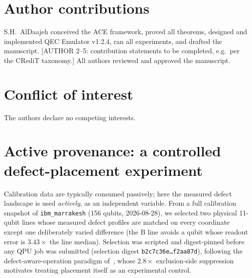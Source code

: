 \documentclass[11pt,a4paper]{article}
\begin{document}
\section*{Author contributions}
S.H.\ AlDaajeh conceived the ACE framework, proved all theorems, designed
and implemented QEC Emulator v1.2.4, ran all experiments, and drafted the
manuscript. [AUTHOR 2--5: contribution statements to be completed, e.g.\
per the CRediT taxonomy.] All authors reviewed and approved the
manuscript.

\section*{Conflict of interest} The authors declare no competing interests.


\appendix
\section{Active provenance: a controlled defect-placement experiment}
\label{app:activeprov}

Calibration data are typically consumed passively; here the measured defect
landscape is used \emph{actively}, as an independent variable. From a full
calibration snapshot of \texttt{ibm\_marrakesh} (156 qubits, 2026-08-28), we
selected two physical 11-qubit lines whose measured defect profiles are
matched on every coordinate except one deliberately varied difference (the
B line avoids a qubit whose readout error is $3.43\times$ the line median).
Selection was scripted and digest-pinned before any QPU job was submitted
(selection digest \texttt{b2c7c36e\ldots f2aa87d}), following the
defect-aware-operation paradigm of~\cite{Bartlett2026defect}, whose $2.8\times$
exclusion-side suppression motivates treating placement itself as an
experimental control.
\end{document}
